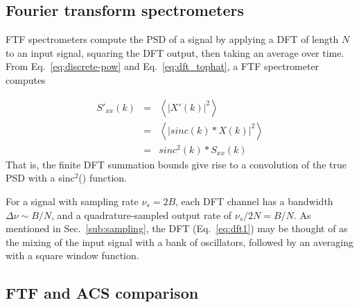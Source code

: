 \documentclass{ws-rv961x669}
\begin{document}
\subsection{Fourier transform spectrometers}\label{sub:ftf}

FTF spectrometers compute the PSD of a signal by applying a DFT of length $N$ to an input signal, squaring the DFT output, then taking an average over time. From Eq.~\ref{eq:discrete-pow} and Eq.~\ref{eq:dft_tophat}, a FTF spectrometer computes

\begin{eqnarray}
	S'_{xx}(k) & = & \left\langle \left|X'(k)\right|^{2}\right\rangle \\
	    & = & \left\langle \left|sinc(k)*X(k)\right|^{2}\right\rangle \\
	    & = & sinc^2(k) * S_{xx}(k) \label{eq:ftf_sinc}
\end{eqnarray}
That is, the finite DFT summation bounds give rise to a convolution of the true PSD with a sinc$^2$() function.

For a signal with sampling rate $\nu_s=2B$, each DFT channel has a bandwidth $\Delta\nu \sim B/N$, and a quadrature-sampled output rate of $\nu_s/2N = B/N$. As mentioned in Sec.~\ref{sub:sampling}, the DFT (Eq.~\ref{eq:dft1}) may be thought of as the mixing of the input signal with a bank of oscillators, followed by an averaging with a square window function. 



\subsection{FTF and ACS comparison}\label{sub:ftf}
\end{document}
